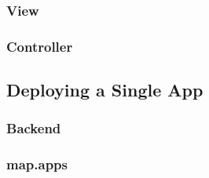 \subsubsection{View} 
\label{subsubsec:View}


\subsubsection{Controller} 
\label{subsubsec:Controller}



\subsection{Deploying a Single App}
\label{subsec:SingleAppDep}

\subsubsection{Backend} 
\label{subsubsec:Backend}

\subsubsection{map.apps} 
\label{subsubsec:mapapps}

